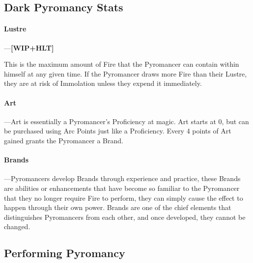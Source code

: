 \documentclass[oneside,11pt,english]{book}
\begin{document}
\subsection{Dark Pyromancy Stats}
\paragraph{Lustre}
---\quad \textbf{[WIP+HLT]}

This is the maximum amount of Fire that the Pyromancer can contain within
himself at any given time. If the Pyromancer draws more Fire than their Lustre,
they are at risk of Immolation unless they expend it immediately.

\paragraph{Art}
---\quad Art is essentially a Pyromancer’s Proficiency at magic. Art starts at
0, but can be purchased using Arc Points just like a Proficiency. Every 4 points
of Art gained grants the Pyromancer a Brand.

\paragraph{Brands}
---\quad Pyromancers develop Brands through experience and practice, these
Brands are abilities or enhancements that have become so familiar to the
Pyromancer that they no longer require Fire to perform, they can simply cause
the effect to happen through their own power. Brands are one of the chief
elements that distinguishes Pyromancers from each other, and once developed,
they cannot be changed.

\subsection{Performing Pyromancy}
\end{document}
